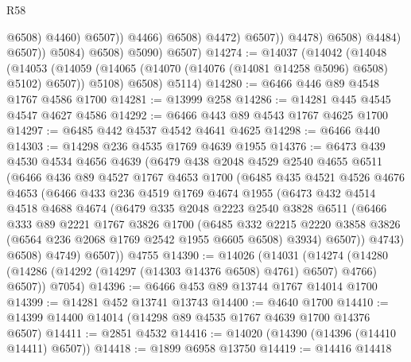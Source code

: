 \begin{lexlean}{R58}
\begin{coremodule}
                                        @6508)
                                      @4460)
                                    @6507))
                                @4466)
                              @6508)
                            @4472)
                          @6507))
                      @4478)
                    @6508)
                  @4484)
                @6507))
            @5084)
          @6508)
        @5090)
      @6507)
@14274 := @14037
    (@14042
      (@14048
        (@14053 (@14059 (@14065 (@14070 (@14076 (@14081 @14258 @5096) @6508) @5102) @6507)) @5108)
        @6508)
      @5114)
@14280 := @6466 @446 @89 @4548 @1767 @4586 @1700
@14281 := @13999 @258
@14286 := @14281 @445 @4545 @4547 @4627 @4586
@14292 := @6466 @443 @89 @4543 @1767 @4625 @1700
@14297 := @6485 @442 @4537 @4542 @4641 @4625
@14298 := @6466 @440
@14303 := @14298 @236 @4535 @1769 @4639 @1955
@14376 := @6473
    @439
    @4530
    @4534
    @4656
    @4639
    (@6479
      @438
      @2048
      @4529
      @2540
      @4655
      @6511
      (@6466
        @436
        @89
        @4527
        @1767
        @4653
        @1700
        (@6485
          @435
          @4521
          @4526
          @4676
          @4653
          (@6466
            @433
            @236
            @4519
            @1769
            @4674
            @1955
            (@6473
              @432
              @4514
              @4518
              @4688
              @4674
              (@6479
                @335
                @2048
                @2223
                @2540
                @3828
                @6511
                (@6466
                  @333
                  @89
                  @2221
                  @1767
                  @3826
                  @1700
                  (@6485
                    @332
                    @2215
                    @2220
                    @3858
                    @3826
                    (@6564 @236 @2068 @1769 @2542 @1955 @6605 @6508)
                    @3934)
                  @6507))
              @4743)
            @6508)
          @4749)
        @6507))
    @4755
@14390 := @14026
    (@14031
      (@14274 (@14280 (@14286 (@14292 (@14297 (@14303 @14376 @6508) @4761) @6507) @4766) @6507))
      @7054)
@14396 := @6466 @453 @89 @13744 @1767 @14014 @1700
@14399 := @14281 @452 @13741 @13743
@14400 := @4640 @1700
@14410 := @14399 @14400 @14014 (@14298 @89 @4535 @1767 @4639 @1700 @14376 @6507)
@14411 := @2851 @4532
@14416 := @14020 (@14390 (@14396 (@14410 @14411) @6507))
@14418 := @1899 @6958 @13750
@14419 := @14416 @14418

\end{coremodule}
\end{lexlean}
